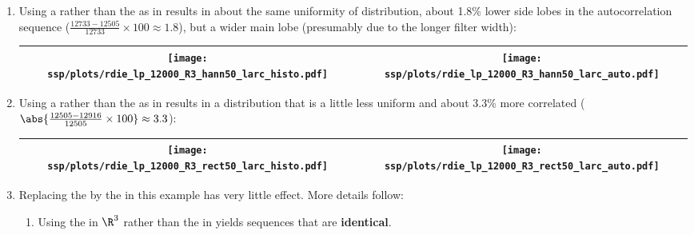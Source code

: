 \begin{example}
\begin{enumerate}
  \item \label{item:rdie_lp_R3_hann50_larc}
        Using a   rather than the 
         as in 
        results in about the same uniformity of distribution, about 1.8\% lower side lobes in the autocorrelation sequence
        ($\frac{12733-12505}{12733}\times100\approx1.8$),
        but a wider main lobe (presumably due to the longer filter width):
     \\\begin{tabular}{|>{\scs}c|>{\scs}c|}
          \hline
          \texttt{[image: ssp/plots/rdie\_lp\_12000\_R3\_hann50\_larc\_histo.pdf]}%
         &\texttt{[image: ssp/plots/rdie\_lp\_12000\_R3\_hann50\_larc\_auto.pdf]}
        \\\hline
     \end{tabular}

  \item \label{item:rdie_lp_R3_rect50_larc}
        Using a  rather than the 
         as in 
        results in a distribution that is a little less uniform and about 3.3\% more correlated
        ($\abs{\frac{12505-12916}{12505}\times100}\approx3.3$):
     \\\begin{tabular}{|>{\scs}c|>{\scs}c|}
          \hline
          \texttt{[image: ssp/plots/rdie\_lp\_12000\_R3\_rect50\_larc\_histo.pdf]}%
         &\texttt{[image: ssp/plots/rdie\_lp\_12000\_R3\_rect50\_larc\_auto.pdf]}
        \\\hline
     \end{tabular}

  \item \label{item:rdie_lp_R3_euclid}
        Replacing the  by the  in this example
        has very little effect.
        More details follow:
    \begin{enumerate}
      \item Using the  in $\R^3$ rather than the  in 
            yields sequences that are \textbf{identical}.


\end{enumerate}
\end{enumerate}
\end{example}
